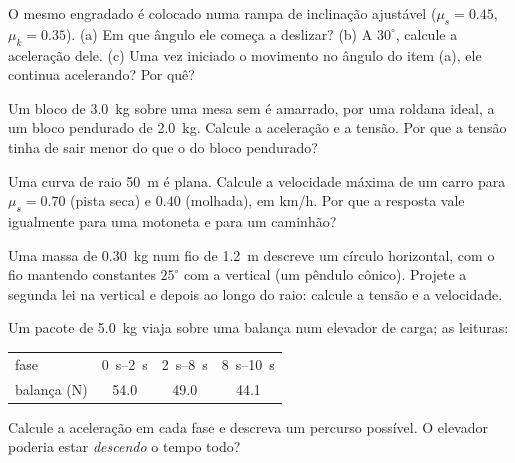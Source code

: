 \begin{exercise}[$\star\star$]\label{exo:g12:newtons-laws:7}
O mesmo engradado é colocado numa rampa de inclinação ajustável ($\mu_s = 0.45$,
$\mu_k = 0.35$). (a) Em que ângulo ele começa a deslizar? (b) A $30^\circ$, calcule a
aceleração dele. (c) Uma vez iniciado o movimento no ângulo do item (a), ele continua
acelerando? Por quê?
\end{exercise}

\begin{exercise}[$\star\star$]\label{exo:g12:newtons-laws:8}
Um bloco de \qty{3.0}{kg} sobre uma mesa sem  é amarrado, por uma roldana ideal,
a um bloco pendurado de \qty{2.0}{kg}. Calcule a aceleração e a tensão. Por que a
tensão tinha de sair menor do que o  do bloco pendurado?
\end{exercise}

\begin{exercise}[$\star\star$]\label{exo:g12:newtons-laws:9}
Uma curva de raio \qty{50}{m} é plana. Calcule a velocidade máxima de um carro para
$\mu_s = 0.70$ (pista seca) e $0.40$ (molhada), em \unit{km/h}. Por que a resposta
vale igualmente para uma motoneta e para um caminhão?
\end{exercise}

\begin{exercise}[$\star\star$]\label{exo:g12:newtons-laws:10}
Uma massa de \qty{0.30}{kg} num fio de \qty{1.2}{m} descreve um círculo horizontal,
com o fio mantendo constantes $25^\circ$ com a vertical (um pêndulo cônico). Projete
a segunda lei na vertical e depois ao longo do raio: calcule a tensão e a velocidade.
\end{exercise}

\begin{exercise}[$\star\star$]\label{exo:g12:newtons-laws:11}
Um pacote de \qty{5.0}{kg} viaja sobre uma balança num elevador de carga; as leituras:
\begin{center}\small\begin{tabular}{lccc}
fase & \qtyrange{0}{2}{s} & \qtyrange{2}{8}{s} & \qtyrange{8}{10}{s}\\
balança (\unit{N}) & 54.0 & 49.0 & 44.1
\end{tabular}\end{center}
Calcule a aceleração em cada fase e descreva um percurso possível. O elevador poderia
estar \emph{descendo} o tempo todo?
\end{exercise}

